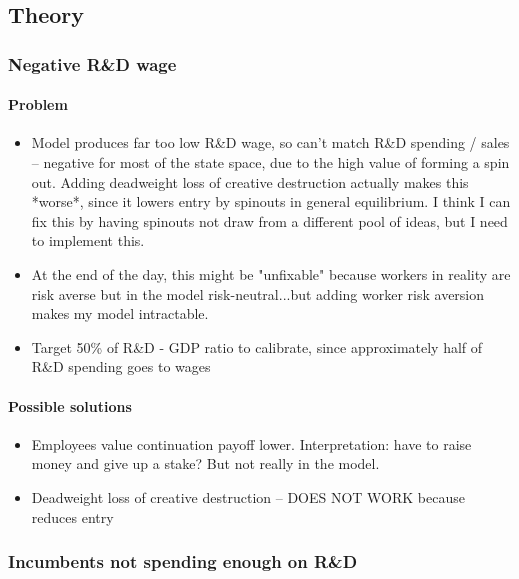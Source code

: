 \documentclass[12pt,english]{article}
\theoremstyle{remark}
\begin{document}
\subsection{Theory}

\subsubsection{Negative R\&D wage}

\paragraph{Problem}

\begin{itemize}
	\item Model produces far too low R\&D wage, so can't match R\&D spending / sales -- negative for most of the state space, due to the high value of forming a spin out. Adding deadweight loss of creative destruction actually makes this *worse*, since it lowers entry by spinouts in general equilibrium. I think I can fix this by having spinouts not draw from a different pool of ideas, but I need to implement this.
	\item At the end of the day, this might be "unfixable" because workers in reality are risk averse but in the model risk-neutral...but adding worker risk aversion makes my model intractable.
	\item Target 50\% of R\&D - GDP ratio to calibrate, since approximately half of R\&D spending goes to wages
\end{itemize}

\paragraph{Possible solutions}

\begin{itemize}
	\item Employees value continuation payoff lower. Interpretation: have to raise money and give up a stake? But not really in the model.
	\item Deadweight loss of creative destruction -- DOES NOT WORK because reduces entry
\end{itemize}


\subsubsection{Incumbents not spending enough on R\&D}
\end{document}
